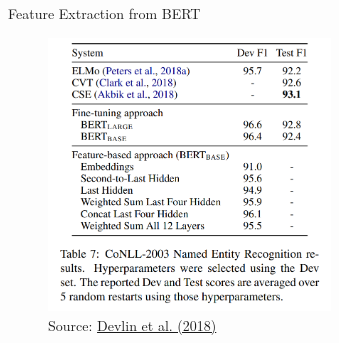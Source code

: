 
\begin{frame}{Feature Extraction from BERT}

	\begin{figure}
	\centering
		\includegraphics[width = 7.5cm]{figure/bert-featextr-results.png}\\ 
		\footnotesize{Source:} \href{https://arxiv.org/pdf/1810.04805.pdf}{\footnotesize Devlin et al. (2018)}
	\end{figure}

\end{frame}


\endlecture

